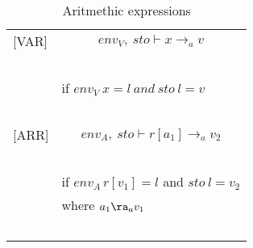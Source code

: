 \begin{table}
\begin{tabular}{l l}
[VAR] & \[env_V, \: sto \vdash x \rightarrow_a v\] \\
~ & ~ \\
~ & \indent\indent if $env_V \: x=l \: and \: sto \: l = v$ \\ 
~ & ~ \\

[ARR] & \[env_A, \: sto \vdash r[a_{1}] \rightarrow_a v_2\] \\
~ & ~ \\
~ & \indent\indent if $env_A \, r[v_{1}]=l$ and $sto \: l=v_2$ \\
~ & \indent\indent where $a_1 \ra_a v_1$ \\
~ & ~ \\

\end{tabular}
\caption{Aritmethic expressions}
\end{table}
